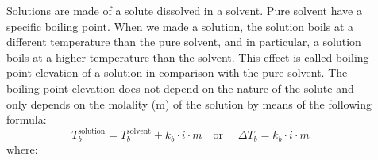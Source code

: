 \documentclass[main.tex]{subfiles}
\newcommand\chapterlabel{physicalsolutions}
\begin{document}
\sloppy 
\begin{description}
\item[] 
Solutions are made of a solute dissolved in a solvent. Pure solvent have a specific boiling point. When we made a solution, the solution boils at a different temperature than the pure solvent, and in particular, a solution boils at a higher temperature than the solvent. This effect is called boiling point elevation of a solution in comparison with the pure solvent. The boiling point elevation does not depend on the nature of the solute and only depends on the molality (m) of the solution by means of the following formula:
\begin{equation}
\boxed{ T_b^{\text{solution}}=T_b^{\text{solvent}}+k_b\cdot i\cdot m 	}
\quad  \text{or }\quad 
\boxed{\Delta T_b =k_b\cdot i\cdot m}
\label{\chapterlabel:equation10}
\end{equation}
where:
\end{description}
\end{document}
